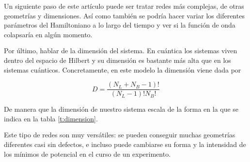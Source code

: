 \documentclass[11pt,a4paper]{article}
\begin{document}
Un siguiente paso de este artículo puede ser tratar redes más complejas, de otras geometrías y dimensiones. Así como también se podría hacer variar los diferentes parámetros del Hamiltoniano a lo largo del tiempo y ver si la función de onda colapsaría en algún momento.

Por último, hablar de la dimensión del sistema. En cuántica los sistemas viven dentro del espacio de Hilbert y su dimensión es bastante más alta que en los sistemas cuánticos. Concretamente, en este modelo la dimensión viene dada por

\begin{equation}
  D=\frac{(N_L+N_B-1)!}{(N_L-1)!N_B!}
\end{equation}

De manera que la dimensión de nuestro sistema escala de la forma en la que se indica en la tabla \ref{t:dimension}.





  
Este tipo de redes son muy versátiles: se pueden conseguir muchas geometrías diferentes casi sin defectos, e incluso puede cambiarse su forma y la intensidad de los mínimos de potencial en el curso de un experimento. 
\end{document}
